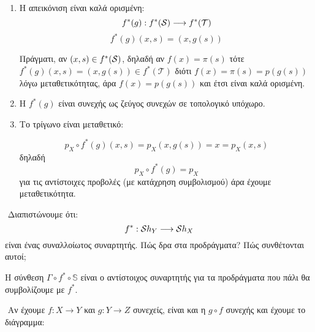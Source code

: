 \begin{enumerate}
    \item Η απεικόνιση είναι καλά ορισμένη:
    $$f^*(g): f^*(\mathcal{S}) \longrightarrow f^*(\mathcal{T})$$
    $$f^*(g)(x,s) = (x,g(s))$$

    \noindent
    Πράγματι, αν $(x,s) \in f^*(\mathcal{S})$, δηλαδή αν $f(x) = \pi(s)$ τότε $f^*(g)(x,s) = (x,g(s)) \in f^*(\mathcal{T})$ διότι $f(x) = \pi (s) = p(g(s))$ λόγω μεταθετικότητας, άρα $f(x) = p(g(s))$ και έτσι είναι καλά ορισμένη.

    \item Η $f^*(g)$ είναι συνεχής ως ζεύγος συνεχών σε τοπολογικό υπόχωρο.
    
    \item Το τρίγωνο είναι μεταθετικό:
    
    \begin{figure}[H]
        \centering
    \end{figure}

    $$p_X \circ f^*(g)(x,s) = p_X (x,g(s)) = x = p_X (x,s)$$ δηλαδή
    $$p_X \circ f^*(g) = p_X$$
    για τις αντίστοιχες προβολές (με κατάχρηση συμβολισμού) άρα έχουμε μεταθετικότητα.
\end{enumerate}

$ $\newline
Διαπιστώνουμε ότι:
$$f^*:\mathcal{S} h_Y \longrightarrow \mathcal{S} h_X$$ είναι ένας συναλλοίωτος συναρτητής. Πώς δρα στα προδράγματα? Πώς συνθέτονται αυτοί;

\begin{figure}[H]
    \centering
\end{figure}

\noindent Η σύνθεση $\Gamma \circ f^* \circ \mathbb{S}$ είναι ο αντίστοιχος συναρτητής για τα προδράγματα που πάλι θα συμβολίζουμε με $f^*$.

$ $\newline
Αν έχουμε $f:X\rightarrow Y$ και $g:Y\rightarrow Z$ συνεχείς, είναι και η $g\circ f$ συνεχής και έχουμε το διάγραμμα:

